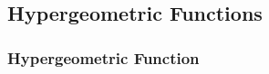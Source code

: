 \documentclass[12pt]{article}      %
\begin{document}
\subsection{Hypergeometric Functions}

\subsubsection{Hypergeometric Function}

\end{document}
